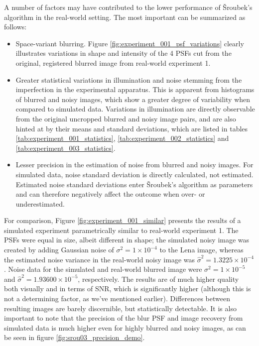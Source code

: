 \documentclass[12pt,notitlepage]{report}
\begin{document}
A number of factors may have contributed to the lower performance of Šroubek's algorithm in the real-world setting. The most important can be summarized as follows:
\begin{itemize}
	\item Space-variant blurring. Figure \ref{fig:experiment_001_psf_variations} clearly illustrates variations in shape and intensity of the 4 PSFs cut from the original, registered blurred image from real-world experiment 1. 
	\item Greater statistical variations in illumination and noise stemming from the imperfection in the experimental apparatus. This is apparent from histograms of blurred and noisy images, which show a greater degree of variability when compared to simulated data. Variations in illumination are directly observable from the original uncropped blurred and noisy image pairs, and are also hinted at by their means and standard deviations, which are listed in tables \ref{tab:experiment_001_statistics}, \ref{tab:experiment_002_statistics} and \ref{tab:experiment_003_statistics}. 
	\item Lesser precision in the estimation of noise from blurred and noisy images. For simulated data, noise standard deviation is directly calculated, not estimated. Estimated noise standard deviations enter Šroubek's algorithm as parameters and can therefore negatively affect the outcome when over- or underestimated.
\end{itemize}

For comparison, Figure \ref{fig:experiment_001_similar} presents the results of a simulated experiment parametrically similar to real-world experiment 1. The PSFs were equal in size, albeit different in shape; the simulated noisy image was created by adding Gaussian noise of $\sigma^2 = 1 \times 10^{-4}$ to the Lena image, whereas the estimated noise variance in the real-world noisy image was $\hat{\sigma}^2 = 1.3225 \times 10^{-4}$. Noise data for the simulated and real-world blurred image were $\sigma^2 = 1 \times 10^{-5}$ and $\hat{\sigma}^2 = 1.93600 \times 10^{-5}$, respectively. The results are of much higher quality both visually and in terms of SNR, which is significantly higher (although this is not a determining factor, as we've mentioned earlier). Differences between resulting images are barely discernible, but statistically detectable. It is also important to note that the precision of the blur PSF and image recovery from simulated data is much higher even for highly blurred and noisy images, as can be seen in figure \ref{fig:srou03_precision_demo}.
\end{document}
